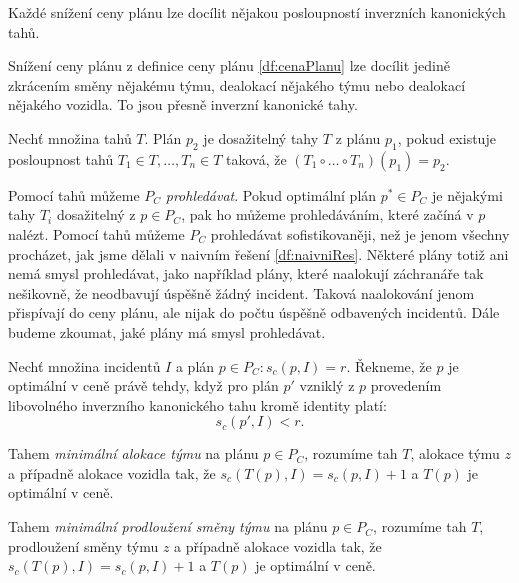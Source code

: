 \begin{veta}\label{veta:kazdeSnizeniCenyJeInv}
  Každé snížení ceny plánu lze docílit nějakou posloupností inverzních kanonických tahů.
\end{veta}
\begin{dukaz}
  Snížení ceny plánu z definice ceny plánu \ref{df:cenaPlanu} lze docílit jedině zkrácením směny nějakému týmu, dealokací nějakého týmu nebo dealokací nějakého vozidla.
  To jsou přesně inverzní kanonické tahy.
\end{dukaz}

\begin{definice}
  Nechť množina tahů $T$.
  Plán $p_2$ je dosažitelný tahy $T$ z plánu $p_1$, pokud existuje posloupnost tahů $T_1 \in T, \dots, T_n \in T$ taková, že $(T_1 \circ \dots \circ T_n)(p_1) = p_2$.
\end{definice}

Pomocí tahů můžeme $P_C$ \textit{prohledávat}.
Pokud optimální plán $p^* \in P_C$ je nějakými tahy $T_i$ dosažitelný z $p \in P_C$, pak ho můžeme prohledáváním, které začíná v $p$ nalézt.
Pomocí tahů můžeme $P_C$ prohledávat sofistikovaněji, než je jenom všechny procházet, jak jsme dělali v naivním řešení \ref{df:naivniRes}.
Některé plány totiž ani nemá smysl prohledávat, jako například plány, které naalokují záchranáře tak nešikovně, že neodbavují úspěšně žádný incident.
Taková naalokování jenom přispívají do ceny plánu, ale nijak do počtu úspěšně odbavených incidentů.
Dále budeme zkoumat, jaké plány má smysl prohledávat.

\begin{definice}
  Nechť množina incidentů $I$ a plán $p \in P_C \colon s_c(p, I) = r$.
  Řekneme, že $p$ je optimální v ceně právě tehdy, když
  pro plán $p'$ vzniklý z $p$ provedením libovolného inverzního kanonického tahu kromě identity platí: 
  \begin{equation*}
    s_c(p', I) < r.
  \end{equation*}
\end{definice}

\begin{definice}
Tahem \textit{minimální alokace týmu} na plánu $p \in P_C$, rozumíme tah $T$, alokace týmu $z$ a případně alokace vozidla tak, že $s_c(T(p), I) = s_c(p, I) + 1$ a $T(p)$ je optimální v ceně.
\end{definice}

\begin{definice}
Tahem \textit{minimální prodloužení směny týmu} na plánu $p \in P_C$, rozumíme tah $T$, prodloužení směny týmu $z$ a případně alokace vozidla tak, že $s_c(T(p), I) = s_c(p, I) + 1$ a $T(p)$ je optimální v ceně.
\end{definice}

